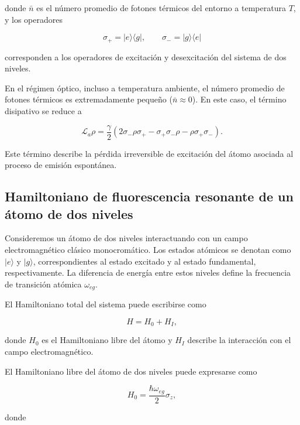 \documentclass[11pt]{report}
\begin{document}
donde $\bar{n}$ es el número promedio de fotones térmicos del entorno a temperatura $T$, y los operadores

\begin{equation}
\sigma_+ = |e\rangle\langle g|, \qquad
\sigma_- = |g\rangle\langle e|
\end{equation}

corresponden a los operadores de excitación y desexcitación del sistema de dos niveles.

En el régimen óptico, incluso a temperatura ambiente, el número promedio de fotones térmicos es extremadamente pequeño ($\bar{n} \approx 0$). En este caso, el término disipativo se reduce a

\begin{equation}
\mathcal{L}_a \rho =
\frac{\gamma}{2}
\left(
2\sigma_- \rho \sigma_+ -
\sigma_+\sigma_- \rho -
\rho \sigma_+\sigma_-
\right).
\end{equation}

Este término describe la pérdida irreversible de excitación del átomo asociada al proceso de emisión espontánea.
\subsection{Hamiltoniano de fluorescencia resonante de un átomo de dos niveles}

Consideremos un átomo de dos niveles interactuando con un campo electromagnético clásico monocromático. Los estados atómicos se denotan como $|e\rangle$ y $|g\rangle$, correspondientes al estado excitado y al estado fundamental, respectivamente. La diferencia de energía entre estos niveles define la frecuencia de transición atómica $\omega_{eg}$.

El Hamiltoniano total del sistema puede escribirse como

\begin{equation}
H = H_0 + H_I ,
\end{equation}

donde $H_0$ es el Hamiltoniano libre del átomo y $H_I$ describe la interacción con el campo electromagnético.

El Hamiltoniano libre del átomo de dos niveles puede expresarse como

\begin{equation}
H_0 = \frac{\hbar \omega_{eg}}{2}\sigma_z ,
\end{equation}

donde
\end{document}
